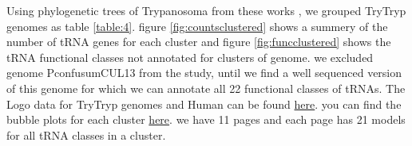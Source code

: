 \documentclass[
10pt, %
a4paper, %
oneside, %
headinclude,footinclude, %
BCOR5mm, %
]{scrartcl}
\begin{document}
Using phylogenetic trees of Trypanosoma from these works \cite{Souza:2018dg,Hughes:2003,Pothirat:2014,Kelly:2017}, we grouped TryTryp genomes as table \ref{table:4}. figure \ref{fig:countsclustered} shows a summery of the number of tRNA genes for each cluster and figure \ref{fig:funcclustered} shows the tRNA functional classes not annotated for clusters of genome. we excluded genome PconfusumCUL13 from the study, until we find a well sequenced version of this genome for which we can annotate all 22 functional classes of tRNAs. The Logo data for TryTryp genomes and Human can be found \href{https://github.com/fhadinezhadUC/Leishmania_2019/tree/master/Results/tsfmInput-output/output/Logos}{here}. you can find the bubble plots for each cluster \href{https://github.com/fhadinezhadUC/Leishmania_2019/tree/master/Results/tsfmInput-output/output/BubblePlots}{here}. we have 11 pages and each page has 21 models for all tRNA classes in a cluster. 
\end{document}
